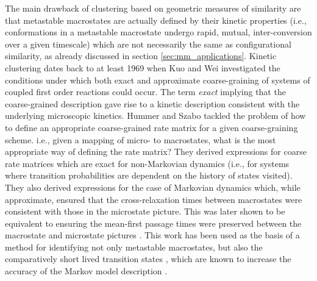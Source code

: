 The main drawback of clustering based on geometric measures of similarity are that metastable macrostates are actually defined by their kinetic properties (i.e., conformations in a metastable macrostate undergo rapid, mutual, inter-conversion over a given timescale) which are not necessarily the same \cite{schutteDirectApproachConformational1999} as configurational similarity, as already discussed in section \ref{sec:mm_applications}. Kinetic clustering dates back to at least 1969 when Kuo and Wei \cite{weiLumpingAnalysisMonomolecular1969, kuoLumpingAnalysisMonomolecular} investigated the conditions under which both exact and approximate coarse-graining of systems of coupled first order reactions could occur. The term \emph{exact} implying that the coarse-grained description gave rise to a kinetic description consistent with the underlying microscopic kinetics.  Hummer and Szabo \cite{hummerOptimalDimensionalityReduction2015a} tackled the problem of how to define an appropriate coarse-grained rate matrix for a given coarse-graining scheme. i.e., given a mapping of micro- to macrostates, what is the most appropriate way of defining the rate matrix?  They derived expressions for coarse rate matrices which are exact for non-Markovian dynamics (i.e., for systems where transition probabilities are dependent on the history of states visited). They also derived expressions for the case of Markovian dynamics which, while approximate, ensured that the cross-relaxation times between macrostates were consistent with those in the microstate picture. This was later shown to be equivalent to ensuring the mean-first passage times were preserved between the macrostate and microstate pictures \cite{kellsCorrelationFunctionsMean2020}. This work has been used as the basis of a method for identifying not only metastable macrostates, but also the comparatively short lived transition states \cite{martiniVariationalIdentificationMarkovian2017}, which are known to increase the accuracy of the Markov model description \cite{prinzMarkovModelsMolecular2011}. 

